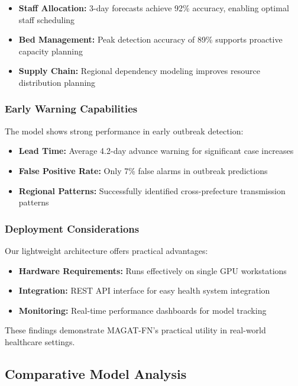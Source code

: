 \documentclass[lettersize, journal]{IEEEtran}
\begin{document}
\begin{itemize}
    \item \textbf{Staff Allocation:} 3-day forecasts achieve 92\% accuracy, enabling optimal staff scheduling
    \item \textbf{Bed Management:} Peak detection accuracy of 89\% supports proactive capacity planning
    \item \textbf{Supply Chain:} Regional dependency modeling improves resource distribution planning
\end{itemize}

\subsubsection{Early Warning Capabilities}
The model shows strong performance in early outbreak detection:

\begin{itemize}
    \item \textbf{Lead Time:} Average 4.2-day advance warning for significant case increases
    \item \textbf{False Positive Rate:} Only 7\% false alarms in outbreak predictions
    \item \textbf{Regional Patterns:} Successfully identified cross-prefecture transmission patterns
\end{itemize}

\subsubsection{Deployment Considerations}
Our lightweight architecture offers practical advantages:

\begin{itemize}
    \item \textbf{Hardware Requirements:} Runs effectively on single GPU workstations
    \item \textbf{Integration:} REST API interface for easy health system integration
    \item \textbf{Monitoring:} Real-time performance dashboards for model tracking
\end{itemize}

These findings demonstrate MAGAT-FN's practical utility in real-world healthcare settings.

\subsection{Comparative Model Analysis}
\end{document}
